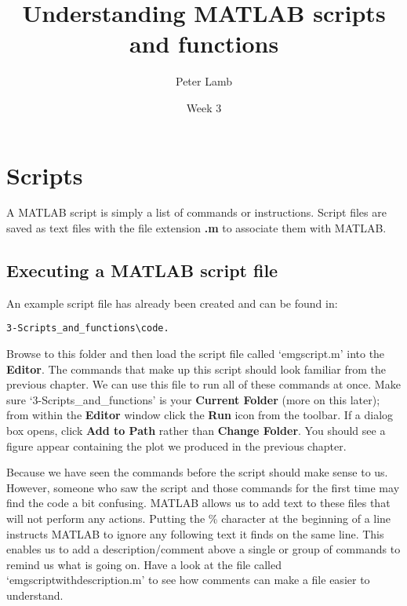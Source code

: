 \documentclass[12pt,a4paper]{article}
\title{Understanding MATLAB scripts and functions}
\author{Peter Lamb}
\date{Week 3}
\begin{document}
\maketitle


\section{Scripts}
A MATLAB script is simply a list of commands or instructions.  
Script files are saved as text files with the file extension \textbf{.m} to associate them with MATLAB.

\subsection{Executing a MATLAB script file}
An example script file has already been created and can be found in:
\begin{lstlisting}[style=Matlab-editor]
3-Scripts_and_functions\code.
\end{lstlisting}
Browse to this folder and then load the script file called `emgscript.m' into the \textbf{Editor}. %
The commands that make up this script should look familiar from the previous chapter.  
We can use this file to run all of these commands at once.  
Make sure `3-Scripts\_and\_functions' is your \textbf{Current Folder} (more on this later); from within the \textbf{Editor} window click the \textbf{Run} icon from the toolbar.
If a dialog box opens, click \textbf{Add to Path} rather than \textbf{Change Folder}.  
You should see a figure appear containing the plot we produced in the previous chapter.  

Because we have seen the commands before the script should make sense to us.  
However, someone who saw the script and those commands for the first time may find the code a bit confusing.  
MATLAB allows us to add text to these files that will not perform any actions.  
Putting the \textcolor{OliveGreen}{\%} character at the beginning of a line instructs MATLAB to ignore any following text it finds on the same line.  
This enables us to add a description/comment above a single or group of commands to remind us what is going on.  
Have a look at the file called `emgscriptwithdescription.m' to see how comments can make a file easier to understand.
\end{document}
